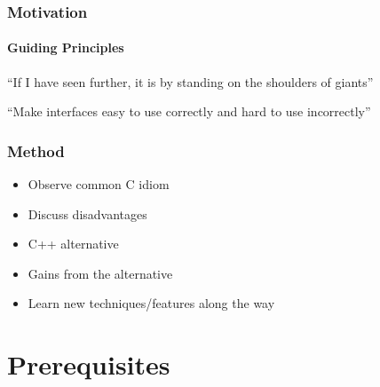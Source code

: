 \documentclass[table]{beamer}
\begin{document}
\begin{frame}
    \frametitle{Motivation}
    \framesubtitle{Guiding Principles}
    \begin{exampleblock}{}
        ``If I have seen further, it is by standing on the shoulders of giants''

        \hspace*{}
    \end{exampleblock}

    \begin{exampleblock}{}
        ``Make interfaces easy to use correctly and hard to use incorrectly''

        \hspace*{}
    \end{exampleblock}

\end{frame}

\begin{frame}
    \frametitle{Method}
    \begin{itemize}
        \item<1->Observe common C idiom
        \item<1->Discuss disadvantages
        \item<1->C++ alternative
        \item<1->Gains from the alternative
        \item<2->Learn new techniques/features along the way
    \end{itemize}
\end{frame}


\section{Prerequisites}
\frame{\sectionpage}
\end{document}
